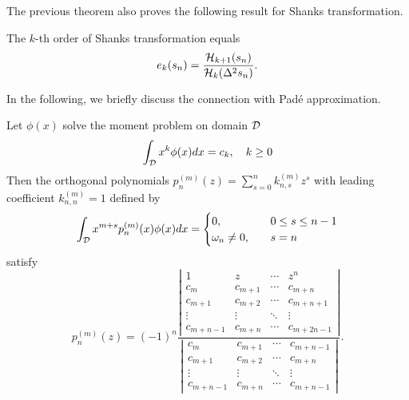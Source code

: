 The previous theorem also proves the following result for Shanks transformation.
\begin{theorem}
The $k$-th order of Shanks transformation equals
\begin{equation}
 e_k(s_n) =  \frac{\mathcal H_{k+1}(s_n)}{\mathcal H_{k}(\Delta^2 s_n)}.
\end{equation}
\end{theorem}
In the following, we briefly discuss the connection with Pad\'e approximation.
\begin{lemma}
    Let $\phi(x)$ solve the moment problem on domain $\mathcal D$
        $$\int_{\mathcal D} x^k \phi(x) dx = c_k,\quad k\ge 0 $$
    Then the orthogonal polynomials
     $p_{n}^{(m)}(z) = \sum_{s = 0}^{n} k_{n, s}^{(m)} z^s$ with leading coefficient $k_{n,n}^{(m)} = 1$ defined by 
    \begin{equation}
        \int_{\mathcal D} x^{m+s} p_n^{(m)}(x) \phi(x) dx = \begin{cases}
            0,\quad &0\le s\le n-1 \\
            \omega_n\neq 0,\quad &s = n
        \end{cases}
    \end{equation}
    satisfy
    \begin{equation}
        p_n^{(m)}(z) = (-1)^n \frac{\left|\begin{matrix}
            1 & z & \cdots & z^n \\
            c_m & c_{m+1} & \cdots & c_{m+n}\\
            c_{m+1} & c_{m+2} & \cdots & c_{m+n+1}\\
            \vdots & \vdots & \ddots & \vdots \\
            c_{m+n-1} & c_{m+n} & \cdots & c_{m+2n-1} 
        \end{matrix}\right|}{\left| \begin{matrix}
            c_m & c_{m+1} & \cdots & c_{m+n-1} \\
            c_{m+1} & c_{m+2} & \cdots & c_{m+n} \\ 
            \vdots & \vdots & \ddots & \vdots \\
            c_{m+n-1} & c_{m+n} & \cdots & c_{m+n-1}
        \end{matrix}\right|} .
    \end{equation}
\end{lemma}
